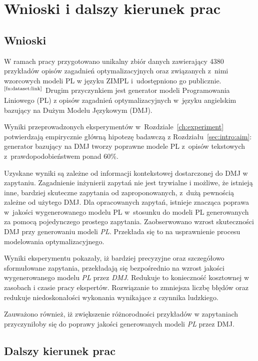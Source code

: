 
\chapter{Wnioski i dalszy kierunek prac}\label{ch:conclusions}

\section{Wnioski}


W ramach pracy przygotowano unikalny zbiór danych zawierający 4380 przykładów opisów zagadnień optymalizacyjnych oraz związanych z~nimi wzorcowych modeli PL w języku ZIMPL i~udostępniono go publicznie.$^\text{\ref{fn:dataset:link}}$ Drugim przyczynkiem jest generator modeli Programowania Liniowego (PL) z opisów zagadnień optymalizacyjnych w~języku angielskim bazujący na Dużym Modelu Językowym (DMJ). 

Wyniki przeprowadzonych eksperymentów w~Rozdziale~\ref{ch:experiment} potwierdzają empirycznie główną hipotezę badawczą z Rozdziału~\ref{sec:intro:aim}: generator bazujący na DMJ tworzy poprawne modele PL z~opisów tekstowych z~prawdopodobieństwem ponad 60\%.


Uzyskane wyniki są zależne od informacji kontekstowej dostarczonej do DMJ w zapytaniu. Zagadnienie inżynierii zapytań nie jest trywialne i możliwe, że istnieją inne, bardziej skuteczne zapytania od zaproponowanych, z~dużą pewnością zależne od użytego DMJ. 
Dla opracowanych zapytań, istnieje znacząca poprawa w~jakości wygenerowanego modelu PL w~stosunku do modeli PL generowanych za pomocą pojedynczego prostego zapytania. Zaobserwowano wzrost skuteczności DMJ przy generowaniu modeli \textit{PL}. Przekłada się to na usprawnienie procesu modelowania optymalizacyjnego. 

Wyniki eksperymentu pokazały, iż bardziej precyzyjne oraz szczegółowo sformułowane zapytania, przekładają się bezpośrednio na wzrost jakości wygenerowanego modelu \textit{PL} przez \textit{DMJ}. Redukuje to konieczność kosztownej w zasobach i czasie pracy ekspertów. Rozwiązanie to zmniejsza liczbę błędów oraz redukuje niedoskonałości wykonania wynikające z czynnika ludzkiego. 

Zauważono również, iż zwiększenie różnorodności przykładów w zapytaniach przyczyniłoby się do poprawy jakości generowanych modeli \textit{PL} przez DMJ.

\section{Dalszy kierunek prac}

